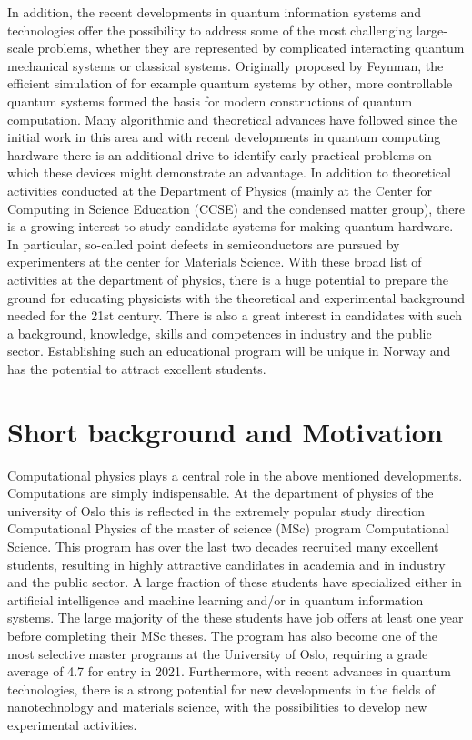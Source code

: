 \documentclass[aps,rmp,preprint,amsmath,amssymb,graphicx,longbibliography]{revtex4-1}
\begin{document}
In addition, the recent developments in quantum information systems
and technologies offer the possibility to address some of the most
challenging large-scale problems, whether they are represented by
complicated interacting quantum mechanical systems or classical
systems.  Originally proposed by Feynman, the efficient simulation of
for example quantum systems by other, more controllable quantum
systems formed the basis for modern constructions of quantum
computation.  Many algorithmic and theoretical advances have followed
since the initial work in this area and with recent developments in
quantum computing hardware there is an additional drive to identify
early practical problems on which these devices might demonstrate an
advantage. In addition to theoretical activities conducted at the
Department of Physics (mainly at the Center for Computing in Science
Education (CCSE) and the condensed matter group), there is a growing
interest to study candidate systems for making quantum hardware. In
particular, so-called point defects in semiconductors are pursued by
experimenters at the center for Materials Science.  With these broad
list of activities at the department of physics, there is a huge
potential to prepare the ground for educating physicists with the
theoretical and experimental background needed for the 21st
century. There is also a great interest in candidates with such a
background, knowledge, skills and competences in industry and the
public sector.  Establishing such an educational program will be
unique in Norway and has the potential to attract excellent students.



\section{Short background and Motivation}

Computational physics plays a central role in the above mentioned
developments.  Computations are simply indispensable.  At the
department of physics of the university of Oslo this is reflected in
the extremely popular study direction Computational Physics of the
master of science (MSc) program Computational Science. This program
has over the last two decades recruited many excellent students,
resulting in highly attractive candidates in academia and in industry
and the public sector. A large fraction of these students have
specialized either in artificial intelligence and machine learning
and/or in quantum information systems.  The large majority of the
these students have job offers at least one year before completing
their MSc theses. The program has also become one of the most
selective master programs at the University of Oslo, requiring a grade
average of 4.7 for entry in 2021. Furthermore, with recent advances in
quantum technologies, there is a strong potential for new developments
in the fields of nanotechnology and materials science, with the
possibilities to develop new experimental activities.
\end{document}
